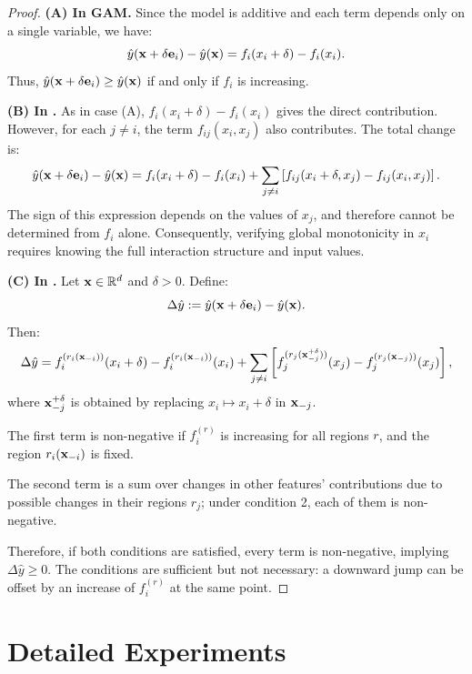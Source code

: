 \begin{proof}

\textbf{(A) In GAM.}
Since the model is additive and each term depends only on a single variable, we have:
\[
\hat{y}(\mathbf{x} + \delta \mathbf{e}_i) - \hat{y}(\mathbf{x}) = f_i(x_i + \delta) - f_i(x_i).
\]
Thus, \( \hat{y}(\mathbf{x} + \delta \mathbf{e}_i) \ge \hat{y}(\mathbf{x}) \) if and only if \( f_i \) is increasing. 

\textbf{(B) In \gamm.}  As in case (A), \( f_i(x_i + \delta) - f_i(x_i) \) gives the direct contribution. However, for each \( j \ne i \), the term \( f_{ij}(x_i, x_j) \) also contributes. The total change is:
\[
\hat{y}(\mathbf{x} + \delta \mathbf{e}_i) - \hat{y}(\mathbf{x}) = f_i(x_i + \delta) - f_i(x_i)
+ \sum_{j \ne i} \left[ f_{ij}(x_i + \delta, x_j) - f_{ij}(x_i, x_j) \right].
\]
The sign of this expression depends on the values of \( x_j \), and therefore cannot be determined from \( f_i \) alone. Consequently, verifying global monotonicity in \( x_i \) requires knowing the full interaction structure and input values. 

\textbf{(C) In \method{}.}
Let \( \mathbf{x} \in \mathbb{R}^d \) and \( \delta > 0 \). Define:
\[
\Delta \hat{y} := \hat{y}(\mathbf{x} + \delta \mathbf{e}_i) - \hat{y}(\mathbf{x}).
\]
Then:
\[
\Delta \hat{y} =
f_i^{(r_i(\mathbf{x}_{-i}))}(x_i + \delta) - f_i^{(r_i(\mathbf{x}_{-i}))}(x_i)
+ \sum_{j \ne i} \left[
f_j^{(r_j(\mathbf{x}_{-j}^{+\delta}))}(x_j) - f_j^{(r_j(\mathbf{x}_{-j}))}(x_j)
\right],
\]
where \( \mathbf{x}_{-j}^{+\delta} \) is obtained by replacing \( x_i \mapsto x_i + \delta \) in \( \mathbf{x}_{-j} \).

The first term is non-negative if \( f_i^{(r)} \) is increasing for all regions \( r \), and the region \( r_i(\mathbf{x}_{-i}) \) is fixed.

The second term is a sum over changes in other features' contributions due to possible changes in their regions \( r_j \); under condition 2, each of them is non-negative.

Therefore, if both conditions are satisfied, every term is non-negative, implying \( \Delta \hat{y} \ge 0 \).
The conditions are sufficient but not necessary: a downward jump can be offset by an increase of \( f_i^{(r)} \) at the same point. 

\end{proof}

\newpage
\section{Detailed Experiments}\label{app:detailed-experiments}
\renewcommand{\floatpagefraction}{0.85}\renewcommand{\topfraction}{0.9}\renewcommand{\bottomfraction}{0.6}\renewcommand{\textfraction}{0.07}


